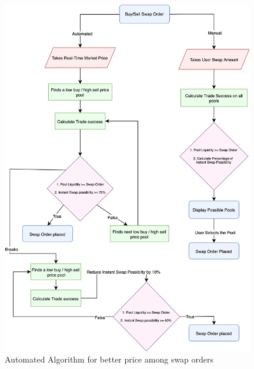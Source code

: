 \documentclass[10pt]{article}
\begin{document}
\begin{figure}[H]
\begin{center}
\includegraphics[width=11cm]{dex-algorithm}
\caption{Automated Algorithm for better price among swap orders}
\end{center}
\end{figure}
\end{document}
